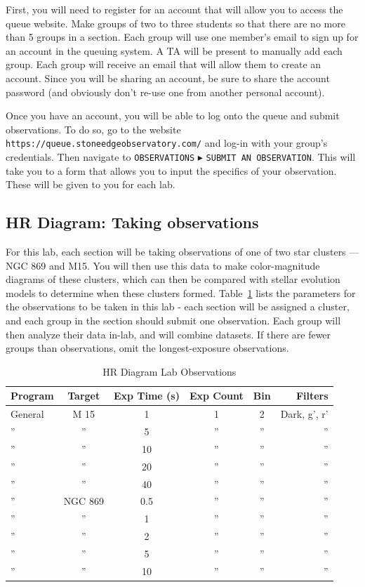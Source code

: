 First, you will need to register for an account that will allow you to access the queue website. Make groups of two to three students so that there are no more than 5 groups in a section. Each group will use one member’s email to sign up for an account in the queuing system. A TA will be present to manually add each group. Each group will receive an email that will allow them to create an account. Since you will be sharing an account, be sure to share the account password (and obviously don't re-use one from another personal account).

Once you have an account, you will be able to log onto the queue and submit observations. To do so, go to the website \texttt{https://queue.stoneedgeobservatory.com/} and log-in with your group's credentials. Then navigate to \texttt{OBSERVATIONS} $\blacktriangleright$ \texttt{SUBMIT AN OBSERVATION}. This will take you to a form that allows you to input the specifics of your observation. These will be given to you for each lab.

\subsection{HR Diagram: Taking observations}
For this lab, each section will be taking observations of one of two star clusters --- NGC 869 and M15. You will then use this data to make color-magnitude diagrams of these clusters, which can then be compared with stellar evolution models to determine when these clusters formed. Table~\ref{hr_diagram_obs} lists the parameters for the observations to be taken in this lab - each section will be assigned a cluster, and each group in the section should submit one observation. Each group will then analyze their data in-lab, and will combine datasets. If there are fewer groups than observations, omit the longest-exposure observations.

\begin{table}
    \centering
    \caption{HR Diagram Lab Observations}
    \label{hr_diagram_obs}
    \begin{tabular}{|l|c|c|c|c|r|}
    \hline
    \textbf{Program} & \textbf{Target} & \textbf{Exp Time (s)} & \textbf{Exp Count} & \textbf{Bin}
         & \textbf{Filters} \\
    \hline
    General & M 15 & 1 & 1 & 2 & Dark, g', r'\\
    \hline
    '' & '' & 5 & '' & '' & '' \\
    \hline
    '' & '' & 10 & '' & '' & '' \\
    \hline
    '' & '' & 20 & '' & '' & '' \\
    \hline
    '' & '' & 40 & '' & '' & '' \\
    \hline
    '' & NGC 869 & 0.5 & '' & '' & ''\\
    \hline
    '' & '' & 1 & '' & '' & '' \\
    \hline
    '' & '' & 2 & '' & '' & '' \\
    \hline
    '' & '' & 5 & '' & '' & '' \\
    \hline
    '' & '' & 10 & '' & '' & '' \\
    \hline
    \end{tabular}
\end{table}